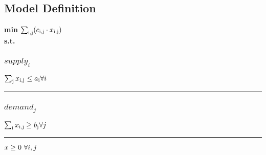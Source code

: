 \documentclass[11pt]{article}
\begin{document}
\subsection*{Model Definition}
\textbf{min} $\sum_\text{i,j} (c_\text{\text{i},\text{j}} \cdot x_\text{\text{i},\text{j}})$\\
\textbf{s.t.}
\subsubsection*{$supply_{i}$}
$
\sum_\text{j} x_\text{\text{i},\text{j}} \leq a_\text{\text{i}}\hfill \forall i
$
\vspace{5pt}
\hrule
\subsubsection*{$demand_{j}$}
$
\sum_\text{i} x_\text{\text{i},\text{j}} \geq b_\text{\text{j}}\hfill \forall j
$
\vspace{5pt}
\hrule
\bigskip
$x\geq 0 ~ \forall i,j\\$
\end{document}
